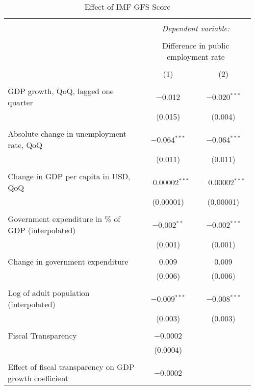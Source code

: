 
\begin{table}[!htbp] \centering 
  \caption{Effect of IMF GFS Score} 
  \label{} 
\begin{tabular}{@{\extracolsep{5pt}}lcc} 
\\[-1.8ex]\hline 
\hline \\[-1.8ex] 
 & \multicolumn{2}{c}{\textit{Dependent variable:}} \\ 
\cline{2-3} 
\\[-1.8ex] & \multicolumn{2}{c}{Difference in public employment rate} \\ 
\\[-1.8ex] & (1) & (2)\\ 
\hline \\[-1.8ex] 
 GDP growth, QoQ, lagged one quarter & $-$0.012 & $-$0.020$^{***}$ \\ 
  & (0.015) & (0.004) \\ 
  & & \\ 
 Absolute change in unemployment rate, QoQ & $-$0.064$^{***}$ & $-$0.064$^{***}$ \\ 
  & (0.011) & (0.011) \\ 
  & & \\ 
 Change in GDP per capita in USD, QoQ & $-$0.00002$^{***}$ & $-$0.00002$^{***}$ \\ 
  & (0.00001) & (0.00001) \\ 
  & & \\ 
 Government expenditure in \% of GDP (interpolated) & $-$0.002$^{**}$ & $-$0.002$^{***}$ \\ 
  & (0.001) & (0.001) \\ 
  & & \\ 
 Change in government expenditure & 0.009 & 0.009 \\ 
  & (0.006) & (0.006) \\ 
  & & \\ 
 Log of adult population (interpolated) & $-$0.009$^{***}$ & $-$0.008$^{***}$ \\ 
  & (0.003) & (0.003) \\ 
  & & \\ 
 Fiscal Transparency & $-$0.0002 &  \\ 
  & (0.0004) &  \\ 
  & & \\ 
 Effect of fiscal transparency on GDP growth coefficient & $-$0.0002 &  \\ 

\end{tabular}
\end{table}
